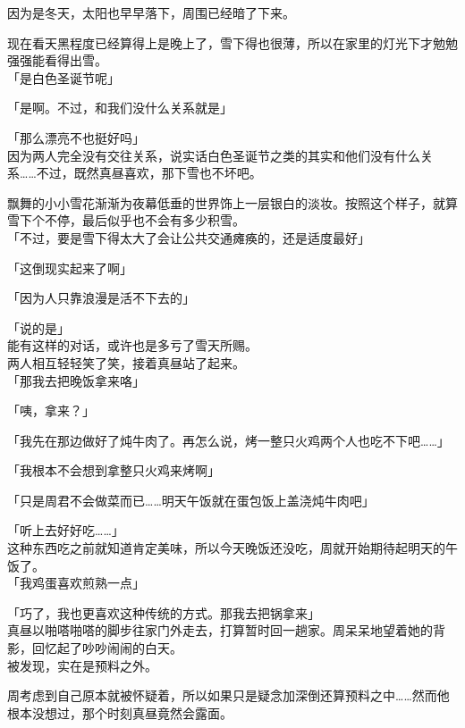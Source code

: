 因为是冬天，太阳也早早落下，周围已经暗了下来。

现在看天黑程度已经算得上是晚上了，雪下得也很薄，所以在家里的灯光下才勉勉强强能看得出雪。\\

「是白色圣诞节呢」

「是啊。不过，和我们没什么关系就是」

「那么漂亮不也挺好吗」\\

因为两人完全没有交往关系，说实话白色圣诞节之类的其实和他们没有什么关系……不过，既然真昼喜欢，那下雪也不坏吧。

飘舞的小小雪花渐渐为夜幕低垂的世界饰上一层银白的淡妆。按照这个样子，就算雪下个不停，最后似乎也不会有多少积雪。\\

「不过，要是雪下得太大了会让公共交通瘫痪的，还是适度最好」

「这倒现实起来了啊」

「因为人只靠浪漫是活不下去的」

「说的是」\\

能有这样的对话，或许也是多亏了雪天所赐。\\

两人相互轻轻笑了笑，接着真昼站了起来。\\

「那我去把晚饭拿来咯」

「咦，拿来？」

「我先在那边做好了炖牛肉了。再怎么说，烤一整只火鸡两个人也吃不下吧……」

「我根本不会想到拿整只火鸡来烤啊」

「只是周君不会做菜而已……明天午饭就在蛋包饭上盖浇炖牛肉吧」

「听上去好好吃……」\\

这种东西吃之前就知道肯定美味，所以今天晚饭还没吃，周就开始期待起明天的午饭了。\\

「我鸡蛋喜欢煎熟一点」

「巧了，我也更喜欢这种传统的方式。那我去把锅拿来」\\

真昼以啪嗒啪嗒的脚步往家门外走去，打算暂时回一趟家。周呆呆地望着她的背影，回忆起了吵吵闹闹的白天。\\

被发现，实在是预料之外。

周考虑到自己原本就被怀疑着，所以如果只是疑念加深倒还算预料之中……然而他根本没想过，那个时刻真昼竟然会露面。\\

